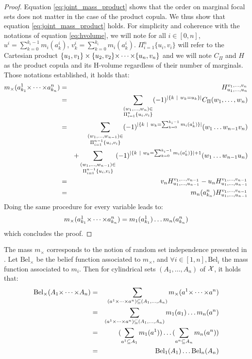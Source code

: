 \begin{proof}
    Equation \eqref{eq:joint_mass_product} shows that the order on marginal focal sets does not matter in the case of the product copula. We thus show that equation \eqref{eq:joint_mass_product} holds.
    For simplicity and coherence with the notations of equation \eqref{eq:hvolume}, we will note for all $i\in[0,n]$, $u^i=\sum_{k=0}^{k_i-1}m_i(a_k^i)$, $v^i_k=\sum_{k=0}^{k_i}m_i(a_k^i)$. $\Pi_{i=1}^n\{u_i, v_i\}$ will refer to the Cartesian product $\{u_1, v_1\}\times\{u_2, v_2\}{\times\dots\times}\{u_n, v_n\}$ and we will note $C_\Pi$ and $H$ as the product copula and its H-volume regardless of their number of marginals. Those notations established, it holds that:
    \begin{eqnarray*}
        m_\times(a^1_{k_1}{\times\dots\times} a^{n}_{k_{n}}) &=& H_{u_1, \dots, u_{n}}^{v_1, \dots, v_{n}}\\
        &=&\sum_{\substack{(w_1, \dots, w_{n})\in\\\Pi_{i=1}^{n}\{u_i, v_i\}}}(-1)^{|\{k~|~w_k=u_k\}|}C_\Pi(w_1, \dots, w_{n})\\
        &=&\sum_{\substack{(w_1, \dots, w_{n-1})\in\\\Pi_{i=1}^{n-1}\{u_i, v_i\}}}(-1)^{|\{k~|~w_k=\sum_{k=0}^{k_i-1}m_i(a^i_k)\}|}(w_1 \dots w_{n-1}v_{n})\\
        && + \sum_{\substack{(w_1, \dots, w_{n-1})\in\\\Pi_{i=1}^{n-1}\{u_i, v_i\}}}(-1)^{|\{k~|~w_k=\sum_{k=0}^{k_i-1}m_i(a^i_k)\}|+1}(w_1 \dots w_{n-1}u_n)\\
        &=& v_{n}H_{u_1, \dots, u_{n-1}}^{v_1, \dots, v_{n-1}} - u_{n}H_{u_1, \dots, u_{n-1}}^{v_1, \dots, v_{n-1}}\\
        &=& m_{n}(a^{n}_{k_{n}})H_{u_1, \dots, u_{n-1}}^{v_1, \dots, v_{n-1}}
    \end{eqnarray*}
    Doing the same procedure for every variable leads to:
    \begin{eqnarray*}
        m_\times(a^1_{k_1}{\times\dots\times} a^n_{k_n}) = m_1(a^1_{k_1})\dots m_n(a^n_{k_n})
    \end{eqnarray*}
    which concludes the proof.
\end{proof}

The mass $m_\times$ corresponds to the notion of random set independence presented in \cite{couso_survey_2000}. Let $\mathrm{Bel}_\times$ be the belief function associated to $m_\times$, and $\forall i\in[1,n], \mathrm{Bel}_i$ the mass function associated to $m_i$. Then for cylindrical sets $(A_1, \dots, A_n)$ of ${\mathcal{X}}$, it holds that:
\begin{eqnarray}
    \mathrm{Bel}_\times(A_1{\times\dots\times} A_n) &=& \sum_{(a^1{\times\dots\times} a^n)\subseteq (A_1, \dots, A_n)}m_\times(a^1{\times\dots\times} a^n)\nonumber\\
    &=& \sum_{(a^1{\times\dots\times} a^n)\subseteq (A_1, \dots, A_n)}m_1(a_1)\dots m_n(a^n)\nonumber\\
    &=& (\sum_{a^1\subseteq A_1}m_1(a^1))\dots(\sum_{a^n\subseteq A_n}m_n(a^n))\nonumber\\
    &=& \mathrm{Bel}_1(A_1)\dots \mathrm{Bel}_n(A_n)
\end{eqnarray}

